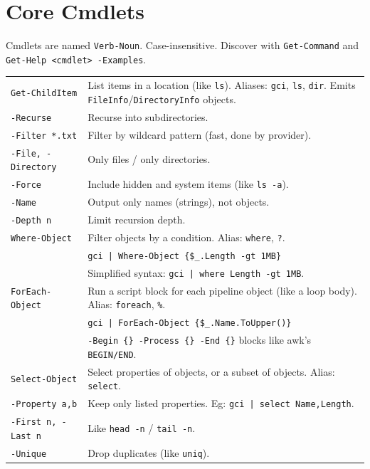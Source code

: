 \section{Core Cmdlets}

Cmdlets are named \texttt{Verb-Noun}. Case-insensitive. Discover with \texttt{Get-Command} and \texttt{Get-Help <cmdlet> -Examples}.\\

\begin{tabularx}{\linewidth}{lX}
    \texttt{Get-ChildItem} & List items in a location (like \texttt{ls}). Aliases: \texttt{gci}, \texttt{ls}, \texttt{dir}. Emits \texttt{FileInfo}/\texttt{DirectoryInfo} objects.\\
    \texttt{-Recurse} & Recurse into subdirectories.\\
    \texttt{-Filter *.txt} & Filter by wildcard pattern (fast, done by provider).\\
    \texttt{-File, -Directory} & Only files / only directories.\\
    \texttt{-Force} & Include hidden and system items (like \texttt{ls -a}).\\
    \texttt{-Name} & Output only names (strings), not objects.\\
    \texttt{-Depth n} & Limit recursion depth.\\
    \hline
    \texttt{Where-Object} & Filter objects by a condition. Alias: \texttt{where}, \texttt{?}.\\
    & \texttt{gci | Where-Object \{\$\_.Length -gt 1MB\}}\\
    & Simplified syntax: \texttt{gci | where Length -gt 1MB}.\\
    \hline
    \texttt{ForEach-Object} & Run a script block for each pipeline object (like a loop body). Alias: \texttt{foreach}, \texttt{\%}.\\
    & \texttt{gci | ForEach-Object \{\$\_.Name.ToUpper()\}}\\
    & \texttt{-Begin \{\} -Process \{\} -End \{\}} blocks like awk's \texttt{BEGIN/END}.\\
    \hline
    \texttt{Select-Object} & Select properties of objects, or a subset of objects. Alias: \texttt{select}.\\
    \texttt{-Property a,b} & Keep only listed properties. Eg: \texttt{gci | select Name,Length}.\\
    \texttt{-First n, -Last n} & Like \texttt{head -n} / \texttt{tail -n}.\\
    \texttt{-Unique} & Drop duplicates (like \texttt{uniq}).\\

\end{tabularx}
